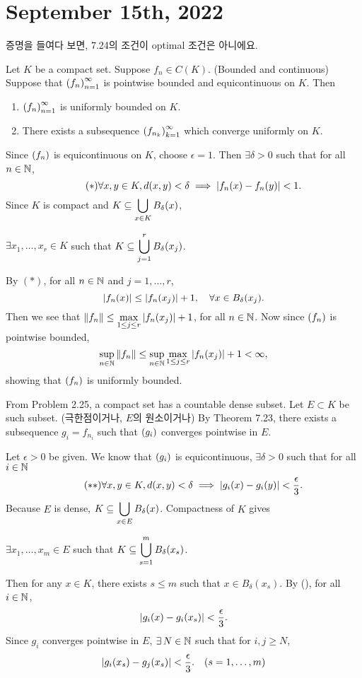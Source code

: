 \section*{September 15th, 2022}

증명을 들여다 보면, 7.24의 조건이 optimal 조건은 아니에요.

  Let \(K\) be a compact set. Suppose \(f_n \in C(K)\). (Bounded and continuous) Suppose that \(\left( f_n \right)_{n=1}^\infty\) is pointwise bounded and equicontinuous on \(K\). Then
\begin{enumerate}
    \item \(\left( f_n \right)_{n=1}^\infty\) is uniformly bounded on \(K\).
    \item There exists a subsequence \(\left( f_{n_k} \right)_{k=1}^\infty\) which converge uniformly on \(K\).
\end{enumerate}

\pf Since \(\left( f_n \right)\) is equicontinuous on \(K\), choose \(\epsilon = 1\). Then \(\exists \delta > 0\) such that for all \(n \in \mathbb{N}\),
\[ \tag{\mast}
    \forall x, y \in K, d(x, y) < \delta \implies \abs{f_n(x) - f_n(y)} < 1.
\]
Since \(K\) is compact and \(K \subseteq \displaystyle\bigcup_{x \in K} B_\delta(x)\),
\begin{center}
    \(\exists x_1, \dots, x_r \in K\) such that \(\displaystyle K \subseteq \bigcup_{j = 1}^r B_\delta(x_j)\).
\end{center}
By \((\ast)\), for all \(n \in \mathbb{N}\) and \(j = 1, \dots, r\),
\[
    \left| f_n(x) \right| \leq \left| f_n(x_j) \right| + 1, \quad \forall x \in B_\delta(x_j).
\]
Then we see that \(\left\lVert f_n \right\rVert \leq \displaystyle \max_{1\leq j\leq r} \left| f_n(x_j) \right| + 1\), for all \(n \in \mathbb{N}\). Now since \(\left( f_n \right)\) is pointwise bounded,
\[
    \sup_{n \in \mathbb{N}} \left\lVert f_n \right\rVert \leq \sup_{n \in \mathbb{N}}\max_{1 \leq j \leq r} \left| f_n(x_j) \right| + 1 < \infty,
\]
showing that \(\left( f_n \right)\) is uniformly bounded.

From Problem 2.25, a compact set has a countable dense subset. Let \(E \subset K\) be such subset. (극한점이거나, \(E\)의 원소이거나) By Theorem 7.23, there exists a subsequence \(g_i = f_{n_i}\) such that \(\left( g_i \right)\) converges pointwise in \(E\).

Let \(\epsilon > 0\) be given. We know that \(\left( g_i \right)\) is equicontinuous, \(\exists \delta > 0\) such that for all \(i \in \mathbb{N}\)
\[ \tag{\mast\mast}
    \forall x, y \in K, d(x, y) < \delta \implies \abs{g_i(x) - g_i(y)} < \dfrac{\epsilon}{3}.
\]
Because \(E\) is dense, \(\displaystyle K \subseteq \bigcup_{x \in E} B_\delta(x)\). Compactness of \(K\) gives
\begin{center}
    \(\exists x_1, \dots, x_m \in E\) such that \(\displaystyle K \subseteq \bigcup_{s = 1}^m B_\delta(x_s)\).
\end{center}
Then for any \(x \in K\), there exists \(s \leq m\) such that \(x \in B_\delta(x_s)\). By (\mast\mast), for all \(i \in \mathbb{N}\),
\[
    \left| g_i(x) - g_i(x_s) \right| < \frac{\epsilon}{3}.
\]
Since \(g_i\) converges pointwise in \(E\), \(\exists N \in \N\) such that for \(i, j \geq N\),
\[
    \left| g_i(x_s) - g_j(x_s) \right| < \frac{\epsilon}{3}. \quad (s = 1, \dots, m)
\]

